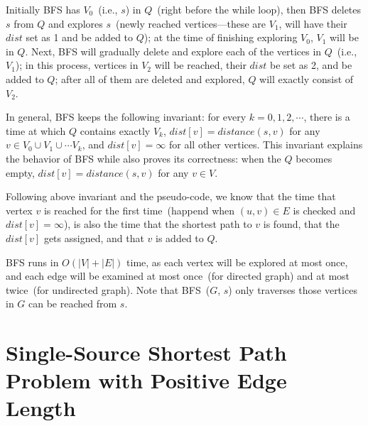 
\begin{minipage}{0.8\textwidth}
	\xxx
	\xxx
	\xxx
	\xxx
	\xxx
	\xxx
	\xxx
	\xxx
	\xxx
	\xxx
	\xxx
	\xxx
	\xxx
	\xxx
	\xxx
	\xxx
\end{minipage}




Initially BFS has $V_0$~(i.e., $s$) in $Q$~(right before the while loop), 
then BFS deletes $s$ from $Q$ and explores $s$~(newly reached vertices---these are $V_1$, will have their $dist$ set as 1 and be added to $Q$);
at the time of finishing exploring $V_0$, $V_1$ will be in $Q$. 
Next, BFS will gradually delete and explore each of the vertices in $Q$~(i.e., $V_1$);
in this process, vertices in $V_2$ will be reached, their $dist$ be set as 2, and be added to $Q$;
after all of them are deleted and explored, $Q$ will exactly consist of $V_2$.

In general, BFS keeps the following invariant: for every $k = 0, 1, 2, \cdots$, 
there is a time at which $Q$ contains exactly $V_k$, $dist[v] = distance(s, v)$ for any $v\in V_0\cup V_1\cup \cdots V_k$,
and $dist[v] = \infty$ for all other vertices.
This invariant explains the behavior of BFS while also proves its correctness:
when the $Q$ becomes empty, $dist[v] = distance(s, v)$ for any $v\in V$.

Following above invariant and the pseudo-code, we know that the time that vertex $v$ is reached for the first time~(happend when $(u,v)\in E$ is checked and $dist[v] = \infty$),
is also the time that the shortest path to $v$ is found, that the $dist[v]$ gets assigned, and that $v$ is added to $Q$.


BFS runs in $O(|V| + |E|)$ time, as each vertex will be explored at most once, and each 
edge will be examined at most once~(for directed graph) and at most twice~(for undirected graph).
Note that BFS~($G$, $s$) only traverses those vertices in $G$ can be reached from $s$.


\section*{Single-Source Shortest Path Problem with Positive Edge Length}

